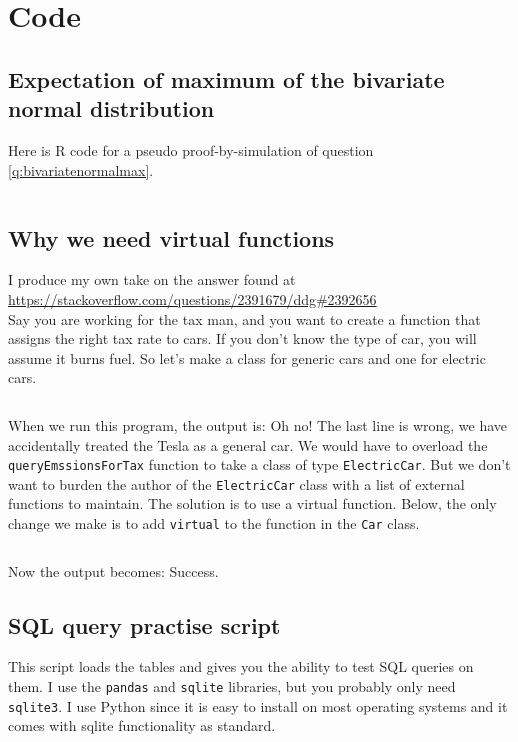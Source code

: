 \documentclass[a4paper]{article}
\begin{document}
\section{Code}
\subsection{Expectation of maximum of the bivariate normal distribution}
\label{ap:mvtnormproof}
Here is R code for a pseudo proof-by-simulation of question \ref{q:bivariatenormalmax}.

\inputminted{r}{./plots/mvtnorm/simtest.R}


\subsection{Why we need virtual functions}
\label{ap:virtualfunctions}
I produce my own take on the answer found at \\
\url{https://stackoverflow.com/questions/2391679/ddg#2392656}\\
Say you are working for the tax man, and you want to create a function that assigns the right tax rate to cars.
If you don't know the type of car, you will assume it burns fuel.
So let's make a class for generic cars and one for electric cars.
\inputminted{cpp}{./plots/virtualfunction/WithoutVirtual.cpp}
When we run this program, the output is:
Oh no! The last line is wrong, we have accidentally treated the Tesla as a general car.
We would have to overload the \verb+queryEmssionsForTax+ function to take a
class of type
\verb+ElectricCar+.
But we don't want to burden the author of the
\verb+ElectricCar+
class with a list of external functions to maintain.
The solution is to use a virtual function.
Below, the only change we make is to add
\verb+virtual+
to the function in the
\verb+Car+
class.
\inputminted{cpp}{./plots/virtualfunction/WithVirtual.cpp}
Now the output becomes:
Success.

\subsection{SQL query practise script}
\label{ap:sqlite}
This script loads the tables and gives you the ability to test SQL queries on them.
I use the \verb+pandas+ and \verb+sqlite+ libraries, but you probably only need \verb+sqlite3+.
I use Python since it is easy to install on most operating systems and it comes with sqlite functionality as standard.
\inputminted{python}{./plots/sql/sql.py}
\end{document}
